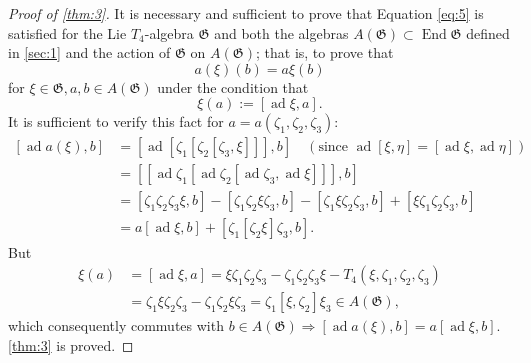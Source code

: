 \documentclass[a4paper]{article}
\newcommand{\ad}{\operatorname{ad}}
\newcommand{\End}{\operatorname{End}}
\begin{document}
\begin{proof}[Proof of \cref{thm:3}]
	It is necessary and sufficient to prove that Equation \eqref{eq:5} is satisfied for the Lie $T_4$-algebra $\mathfrak{G}$ and both the algebras $A(\mathfrak{G}) \subset \End \mathfrak{G}$ defined in \cref{sec:1} and the action of $\mathfrak{G}$ on $A(\mathfrak{G})$; that is, to prove that
	\begin{equation*}
		a(\xi)(b)=a \xi(b)
	\end{equation*}
	for $\xi \in \mathfrak{G}, a, b \in A(\mathfrak{G})$ under the condition that
	\begin{equation*}
		\xi(a):=[\ad \xi, a] .
	\end{equation*}
	It is sufficient to verify this fact for $a=a\left(\zeta_1, \zeta_2, \zeta_3\right)$:
	\begin{equation*}
		\begin{split}
			{[\ad a(\xi), b] } & =[\ad[\zeta_1[\zeta_2[\zeta_3, \xi]]], b] \quad (\text{since } \ad[\xi, \eta]=[\ad \xi, \ad \eta]) \\
			& =[[\ad \zeta_1[\ad \zeta_2[\ad \zeta_3, \ad \xi]]], b] \\
			& =[\zeta_1 \zeta_2 \zeta_3 \xi, b]-[\zeta_1 \zeta_2 \xi \zeta_3, b]-[\zeta_1 \xi \zeta_2 \zeta_3, b]+[\xi \zeta_1 \zeta_2 \zeta_3, b] \\
			& =a[\ad \xi, b]+[\zeta_1[\zeta_2 \xi] \zeta_3, b] .
		\end{split}
	\end{equation*}
	But
	\begin{equation*}
		\begin{aligned}
			\xi(a) & =[\ad \xi, a]=\xi \zeta_1 \zeta_2 \zeta_3-\zeta_1 \zeta_2 \zeta_3 \xi-T_4\left(\xi, \zeta_1, \zeta_2, \zeta_3\right) \\
			& =\zeta_1 \xi \zeta_2 \zeta_3-\zeta_1 \zeta_2 \xi \zeta_3=\zeta_1[\xi, \zeta_2] \xi_3 \in A(\mathfrak{G}),
		\end{aligned}
	\end{equation*}
	which consequently commutes with $b \in A(\mathfrak{G}) \Rightarrow [\ad a(\xi), b] = a [\ad \xi, b]$.
	\cref{thm:3} is proved.
\end{proof}
\end{document}
